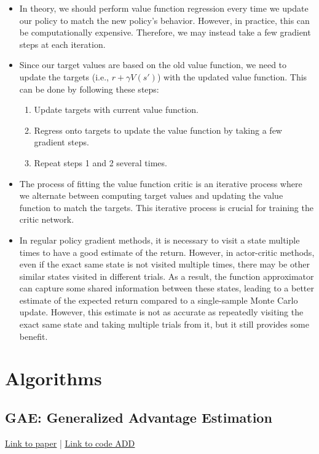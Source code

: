 \documentclass{article}
\begin{document}
\begin{itemize}
\item In theory, we should perform value function regression every time we update our policy to match the new policy's behavior. However, in practice, this can be computationally expensive. Therefore, we may instead take a few gradient steps at each iteration.
\item Since our target values are based on the old value function, we need to update the targets (i.e., $r + \gamma V(s')$) with the updated value function. This can be done by following these steps:
\begin{enumerate}
\item Update targets with current value function.
\item Regress onto targets to update the value function by taking a few gradient steps.
\item Repeat steps 1 and 2 several times.
\end{enumerate}
\item The process of fitting the value function critic is an iterative process where we alternate between computing target values and updating the value function to match the targets. This iterative process is crucial for training the critic network.
\item In regular policy gradient methods, it is necessary to visit a state multiple times to have a good estimate of the return. However, in actor-critic methods, even if the exact same state is not visited multiple times, there may be other similar states visited in different trials. As a result, the function approximator can capture some shared information between these states, leading to a better estimate of the expected return compared to a single-sample Monte Carlo update. However, this estimate is not as accurate as repeatedly visiting the exact same state and taking multiple trials from it, but it still provides some benefit.
\end{itemize}

\newpage

\section{Algorithms}
\subsection{GAE: Generalized Advantage Estimation}\label{section:GAE}
\href{https://arxiv.org/abs/1506.02438}{\underline{Link to paper}} | \href{https://arxiv.org/abs/1506.02438}{\underline{Link to code ADD}} 
\end{document}
